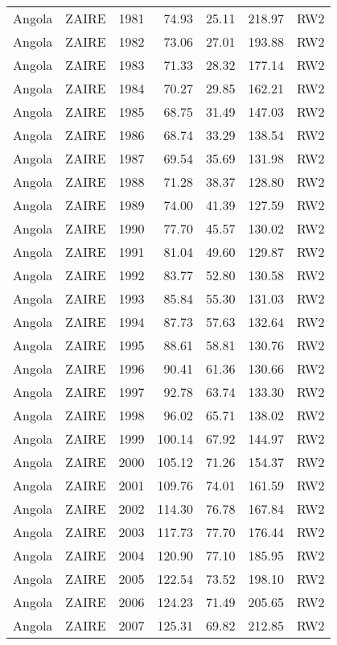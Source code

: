 \begin{longtable}{lllrrrl}
  Angola & ZAIRE & 1981 & 74.93 & 25.11 & 218.97 & RW2 \\ 
  Angola & ZAIRE & 1982 & 73.06 & 27.01 & 193.88 & RW2 \\ 
  Angola & ZAIRE & 1983 & 71.33 & 28.32 & 177.14 & RW2 \\ 
  Angola & ZAIRE & 1984 & 70.27 & 29.85 & 162.21 & RW2 \\ 
  Angola & ZAIRE & 1985 & 68.75 & 31.49 & 147.03 & RW2 \\ 
  Angola & ZAIRE & 1986 & 68.74 & 33.29 & 138.54 & RW2 \\ 
  Angola & ZAIRE & 1987 & 69.54 & 35.69 & 131.98 & RW2 \\ 
  Angola & ZAIRE & 1988 & 71.28 & 38.37 & 128.80 & RW2 \\ 
  Angola & ZAIRE & 1989 & 74.00 & 41.39 & 127.59 & RW2 \\ 
  Angola & ZAIRE & 1990 & 77.70 & 45.57 & 130.02 & RW2 \\ 
  Angola & ZAIRE & 1991 & 81.04 & 49.60 & 129.87 & RW2 \\ 
  Angola & ZAIRE & 1992 & 83.77 & 52.80 & 130.58 & RW2 \\ 
  Angola & ZAIRE & 1993 & 85.84 & 55.30 & 131.03 & RW2 \\ 
  Angola & ZAIRE & 1994 & 87.73 & 57.63 & 132.64 & RW2 \\ 
  Angola & ZAIRE & 1995 & 88.61 & 58.81 & 130.76 & RW2 \\ 
  Angola & ZAIRE & 1996 & 90.41 & 61.36 & 130.66 & RW2 \\ 
  Angola & ZAIRE & 1997 & 92.78 & 63.74 & 133.30 & RW2 \\ 
  Angola & ZAIRE & 1998 & 96.02 & 65.71 & 138.02 & RW2 \\ 
  Angola & ZAIRE & 1999 & 100.14 & 67.92 & 144.97 & RW2 \\ 
  Angola & ZAIRE & 2000 & 105.12 & 71.26 & 154.37 & RW2 \\ 
  Angola & ZAIRE & 2001 & 109.76 & 74.01 & 161.59 & RW2 \\ 
  Angola & ZAIRE & 2002 & 114.30 & 76.78 & 167.84 & RW2 \\ 
  Angola & ZAIRE & 2003 & 117.73 & 77.70 & 176.44 & RW2 \\ 
  Angola & ZAIRE & 2004 & 120.90 & 77.10 & 185.95 & RW2 \\ 
  Angola & ZAIRE & 2005 & 122.54 & 73.52 & 198.10 & RW2 \\ 
  Angola & ZAIRE & 2006 & 124.23 & 71.49 & 205.65 & RW2 \\ 
  Angola & ZAIRE & 2007 & 125.31 & 69.82 & 212.85 & RW2 \\ 

\end{longtable}
